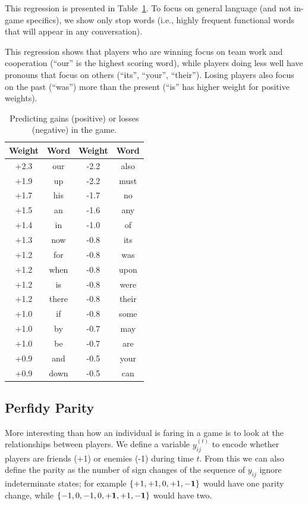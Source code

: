 \documentclass[11pt,letterpaper]{article}
\begin{document}
This regression is presented in Table~\ref{tab:gain-loss}.  To focus
on general language (and not in-game specifics), we show only stop
words (i.e., highly frequent functional words that will appear in any
conversation).

This regression shows that players who are winning focus on team work
and cooperation (``our'' is the highest scoring word), while players
doing less well have pronouns that focus on others (``its'', ``your'',
``their'').  Losing players also focus on the past (``was'') more than
the present (``is'' has higher weight for positive weights).

\begin{table}
  \begin{center}
  \begin{tabular}{cc|cc}
    Weight & Word & Weight & Word \\
    \hline
    +2.3 & our  & -2.2 & also \\
    +1.9 & up   & -2.2 & must \\
    +1.7 & his  & -1.7 & no \\
    +1.5 & an   & -1.6 & any\\
    +1.4 & in   & -1.0 & of\\
    +1.3 & now  & -0.8 & its\\
    +1.2 & for  & -0.8 & was\\
    +1.2 & when & -0.8 & upon\\
    +1.2 & is   & -0.8 & were\\
    +1.2 & there& -0.8 & their\\
    +1.0 & if   & -0.8 & some\\
    +1.0 & by   & -0.7 & may\\
    +1.0 & be   & -0.7 & are\\
    +0.9 & and  & -0.5 & your\\
    +0.9 & down & -0.5 & can\\
    \hline
  \end{tabular}
  \end{center}
  \caption{Predicting gains (positive) or losses (negative) in the game.}
  \label{tab:gain-loss}
\end{table}

\subsection{Perfidy Parity}
\label{sec:parity}

More interesting than how an individual is faring in a game is to look
at the relationships between players.  We define a variable
$y_{ij}^{(t)}$ to encode whether players are friends (+1) or enemies
(-1) during time $t$.  From this we can also define the parity as the
number of sign changes of the sequence of $y_{ij}$ ignore
indeterminate states; for example $\{+1, +1, 0, +1, {\bf -1}\}$ would
have one parity change, while $\{-1, 0, -1, 0, {\bf +1}, +1, {\bf
  -1}\}$ would have two.
\end{document}
